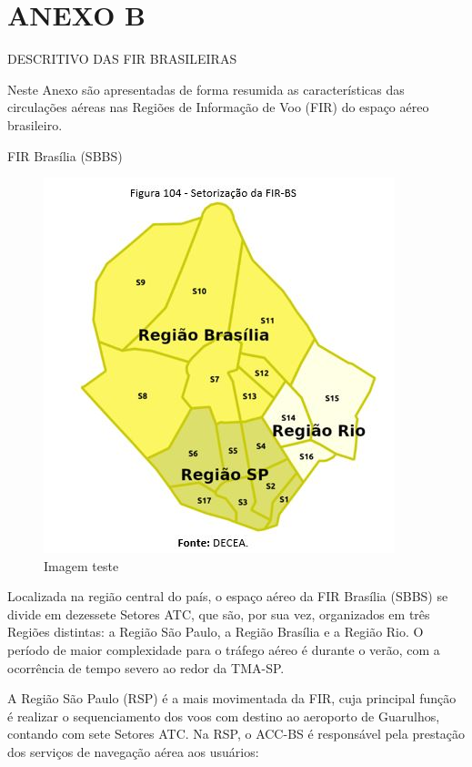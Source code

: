 \documentclass[
]{book}
\begin{document}
\hypertarget{anexo-b}{%
\chapter{ANEXO B}\label{anexo-b}}

DESCRITIVO DAS FIR BRASILEIRAS

Neste Anexo são apresentadas de forma resumida as características das circulações aéreas nas Regiões de Informação de Voo (FIR) do espaço aéreo brasileiro.

FIR Brasília (SBBS)

\begin{figure}
\centering
\includegraphics{imagens/fig96.jpg}
\caption{Imagem teste}
\end{figure}

Localizada na região central do país, o espaço aéreo da FIR Brasília (SBBS) se divide em dezessete Setores ATC, que são, por sua vez, organizados em três Regiões distintas: a Região São Paulo, a Região Brasília e a Região Rio. O período de maior complexidade para o tráfego aéreo é durante o verão, com a ocorrência de tempo severo ao redor da TMA-SP.

A Região São Paulo (RSP) é a mais movimentada da FIR, cuja principal função é realizar o sequenciamento dos voos com destino ao aeroporto de Guarulhos, contando com sete Setores ATC. Na RSP, o ACC-BS é responsável pela prestação dos serviços de navegação aérea aos usuários:
\end{document}
